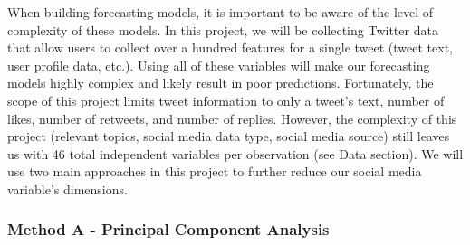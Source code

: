 \documentclass[12pt,oneside]{chicagocapstone}
\begin{document}
When building forecasting models, it is important to be aware of the level of complexity of these models. In this project, we will be collecting Twitter data that allow users to collect over a hundred features for a single tweet (tweet text, user profile data, etc.). Using all of these variables will make our forecasting models highly complex and likely result in poor predictions. Fortunately, the scope of this project limits tweet information to only a tweet's text, number of likes, number of retweets, and number of replies. However, the complexity of this project (relevant topics, social media data type, social media source) still leaves us with 46 total independent variables per observation (see Data section). We will use two main approaches in this project to further reduce our social media variable's dimensions.

\hypertarget{method-a---principal-component-analysis}{%
\subsubsection*{Method A - Principal Component Analysis}\label{method-a---principal-component-analysis}}
\end{document}
